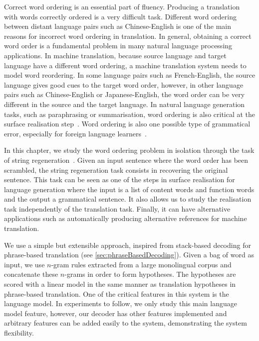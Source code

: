 Correct word ordering is an essential part of fluency.
Producing a translation with words correctly ordered is
a very difficult task.
Different word ordering between distant language pairs such as
Chinese-English is one of the main reasons for incorrect word ordering in translation.
In general, obtaining a correct word order is a fundamental problem in many natural language
processing applications.
In machine translation, because
source language and target language have a different word
ordering, a machine translation system needs to model word
reordering. In some language pairs such as French-English, the
source language gives good cues to the target word order, however,
in other language pairs such as Chinese-English or Japanese-English,
the word order can be very different in the source and
the target language. In natural language generation tasks, such
as paraphrasing or summarisation, word ordering
is also critical at the surface realisation
step~\citep{reiter-dale:1997:JNLE}.
Word ordering is also one possible type of grammatical
error, especially for foreign language
learners~\citep{yu-chen:2012:COLING}. %

In this chapter, we study the word ordering problem in
isolation through the task of
string regeneration~\citep{wan-dras-dale-paris:2009:EACL}.
Given an input sentence where the word order has
been scrambled, the string regeneration task consists in recovering
the original sentence. This task can be seen as one of the
steps in surface realisation for language generation where
the input is a list of content words and function words and
the output a grammatical sentence. It also allows us to study
the realisation task independently of the translation task.
Finally, it can have alternative applications such as
automatically producing alternative references for machine
translation.

We use a simple but extensible approach, inspired from
stack-based decoding for phrase-based
translation (see \autoref{sec:phraseBasedDecoding}).
Given a bag of word as input, we use $n$-gram rules
extracted from a large monolingual corpus and concatenate
these $n$-grams in order to form hypotheses. The hypotheses are scored
with a linear model in the same manner as translation
hypotheses in phrase-based translation.
One of the critical features in this system
is the language model. In experiments to follow, we only study
this main language model feature, however, our decoder has other features
implemented and
arbitrary features can be added easily to the
system, demonstrating the system flexibility.

